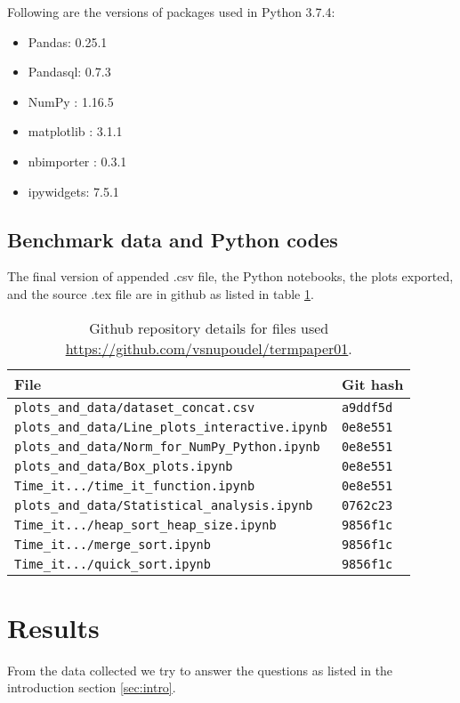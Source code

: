 \documentclass[sigconf, nonacm, natbib, screen, balance=False]{acmart}
\begin{document}
Following are the versions of packages used in Python 3.7.4:
\begin{multicols}{2}
\begin{itemize}
\item Pandas:    0.25.1
\item Pandasql:    0.7.3
\item NumPy :      1.16.5
\item matplotlib :   3.1.1
\item nbimporter :  0.3.1
\item ipywidgets: 7.5.1
\end{itemize}
\end{multicols}

\subsection{Benchmark data and Python codes}\label{sec:githubfiles}
The final version of appended .csv file, the Python notebooks, the plots exported, and the source .tex file are in github as listed in table \ref{tab:hashes}.

\begin{table}[ht]
\caption{Github repository details for files used 
\url{https://github.com/vsnupoudel/termpaper01}.}
\label{tab:hashes}
\begin{tabular}{|l|l|}
\hline
File & Git hash 
\\\hline
\verb!plots_and_data/dataset_concat.csv! & \verb!a9ddf5d! \\
\verb!plots_and_data/Line_plots_interactive.ipynb! & \verb!0e8e551! \\
\verb!plots_and_data/Norm_for_NumPy_Python.ipynb! & \verb!0e8e551! \\
\verb!plots_and_data/Box_plots.ipynb! & \verb!0e8e551! \\
\verb!Time_it.../time_it_function.ipynb! & \verb!0e8e551! \\
\verb!plots_and_data/Statistical_analysis.ipynb! & \verb!0762c23! \\
\verb!Time_it.../heap_sort_heap_size.ipynb!	& \verb!9856f1c! \\
\verb!Time_it.../merge_sort.ipynb! & \verb!9856f1c! \\
\verb!Time_it.../quick_sort.ipynb! & \verb!9856f1c!  \\
\hline
\end{tabular}
\end{table}

\section{Results}\label{sec:results}
From the data collected we try to answer the questions as listed in the introduction section \ref{sec:intro}.
\end{document}
